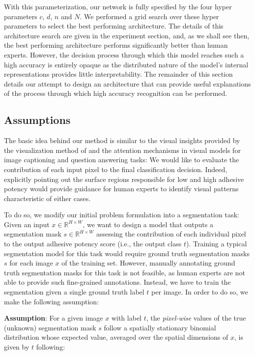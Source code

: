 \documentclass[10pt,twocolumn,letterpaper]{article}
\begin{document}
With this parameterization, our network is fully specified by the four hyper parameters $c$, $d$, $n$ and $N$.
We performed a grid search over these hyper parameters to select the best performing architecture.
The details of this architecture search are given in the experiment section,
and, as we shall see then, the best performing architecture performs significantly better than human experts.
However, the decision process through which this model reaches such a high accuracy is entirely opaque
as the distributed nature of the model's internal representations provides little interpretability.
The remainder of this section details our attempt to design an architecture that can provide 
useful explanations of the process through which high accuracy recognition can be performed.

\subsection{Assumptions}
The basic idea behind our method is similar to the visual insights provided by the
visualization method of \cite{yosinski2015understanding} and the attention mechanisms in visual models 
for image captioning \cite{you2016image} and question answering \cite{li2018knowing} tasks:
We would like to evaluate the contribution of each input pixel to the final classification decision.
Indeed, explicitly pointing out the surface regions responsible 
for low and high adhesive potency would provide guidance for human experts to 
identify visual patterns characteristic of either cases.

To do so, we modify our initial problem formulation into a segmentation task:
Given an input $x \in \mathbb{R}^{H \times W}$, we want to design a model that outputs 
a segmentation mask $s \in \mathbb{R}^{H \times W}$ assessing the contribution of each individual pixel to the output adhesive potency score (i.e., the output class $t$).
Training a typical segmentation model for this task would require ground truth 
segmentation masks $s$ for each image $x$ of the training set.
However, manually annotating ground truth segmentation masks for this task is not feasible, 
as human experts are not able to provide such fine-grained annotations.
Instead, we have to train the segmentation given a single ground truth label $t$ per image.
In order to do so, we make the following assumption:

\textbf{Assumption}: 
For a given image $x$ with label $t$, 
the \textit{pixel-wise} values of the true (unknown) segmentation mask $s$
follow a spatially stationary binomial distribution whose expected value, 
averaged over the spatial dimensions of $x$, is given by $t$ following:
\end{document}
